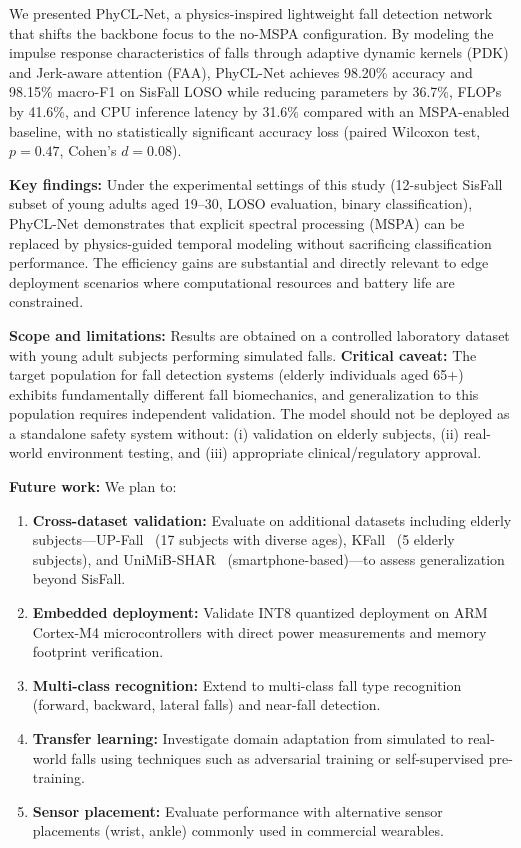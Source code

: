 \documentclass{article}
\begin{document}
We presented PhyCL-Net, a physics-inspired lightweight fall detection network that shifts the backbone focus to the no-MSPA configuration. By modeling the impulse response characteristics of falls through adaptive dynamic kernels (PDK) and Jerk-aware attention (FAA), PhyCL-Net achieves 98.20\% accuracy and 98.15\% macro-F1 on SisFall LOSO while reducing parameters by 36.7\%, FLOPs by 41.6\%, and CPU inference latency by 31.6\% compared with an MSPA-enabled baseline, with no statistically significant accuracy loss (paired Wilcoxon test, $p=0.47$, Cohen's $d=0.08$).

\textbf{Key findings:} Under the experimental settings of this study (12-subject SisFall subset of young adults aged 19--30, LOSO evaluation, binary classification), PhyCL-Net demonstrates that explicit spectral processing (MSPA) can be replaced by physics-guided temporal modeling without sacrificing classification performance. The efficiency gains are substantial and directly relevant to edge deployment scenarios where computational resources and battery life are constrained.

\textbf{Scope and limitations:} Results are obtained on a controlled laboratory dataset with young adult subjects performing simulated falls. \textbf{Critical caveat:} The target population for fall detection systems (elderly individuals aged 65+) exhibits fundamentally different fall biomechanics, and generalization to this population requires independent validation. The model should not be deployed as a standalone safety system without: (i) validation on elderly subjects, (ii) real-world environment testing, and (iii) appropriate clinical/regulatory approval.

\textbf{Future work:} We plan to:
\begin{enumerate}
    \item \textbf{Cross-dataset validation:} Evaluate on additional datasets including elderly subjects---UP-Fall~\cite{Casilari2016UPFall,Casilari2015Wearable} (17 subjects with diverse ages), KFall~\cite{Kwolek2014KFall} (5 elderly subjects), and UniMiB-SHAR~\cite{Micucci2017UniMiB} (smartphone-based)---to assess generalization beyond SisFall.
    \item \textbf{Embedded deployment:} Validate INT8 quantized deployment on ARM Cortex-M4 microcontrollers with direct power measurements and memory footprint verification.
    \item \textbf{Multi-class recognition:} Extend to multi-class fall type recognition (forward, backward, lateral falls) and near-fall detection.
    \item \textbf{Transfer learning:} Investigate domain adaptation from simulated to real-world falls using techniques such as adversarial training or self-supervised pre-training.
    \item \textbf{Sensor placement:} Evaluate performance with alternative sensor placements (wrist, ankle) commonly used in commercial wearables.
\end{enumerate}
\end{document}
